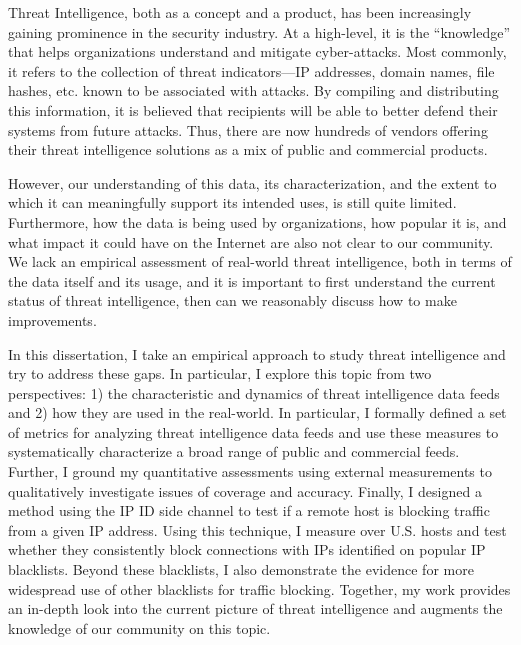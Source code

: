 \begin{dissertationabstract}

Threat Intelligence, both as a concept and a product, has been increasingly
gaining prominence in the security industry. At a high-level, it is the 
``knowledge'' that helps organizations understand and mitigate cyber-attacks.
Most commonly, it refers to the collection of threat indicators---IP 
addresses, domain names, file hashes, etc. known to be associated with 
attacks. By compiling and distributing this information, it is believed 
that recipients will be able to better 
defend their systems from future attacks. Thus, there are now hundreds of
vendors offering their threat intelligence solutions as a mix of public and
commercial products. 

However, our understanding of this data, its characterization, and the
extent to which it can meaningfully support its intended uses, is
still quite limited. Furthermore, how the data is being used by
organizations, how popular it is, and what impact it could have on the 
Internet are also not clear to our community. We lack an empirical 
assessment of real-world threat intelligence, both in terms of the data
itself and its usage, and it is important to first understand the current 
status of threat intelligence, then can we reasonably discuss how to make
improvements.

In this dissertation, I take an empirical approach to study threat 
intelligence and try to address these gaps. In particular, I explore 
this topic from two perspectives: 1) the characteristic and dynamics of 
threat intelligence data feeds and 2) how they are used in the 
real-world. In particular, I formally defined a set of metrics for 
analyzing threat intelligence data feeds and use these measures to 
systematically characterize a broad range of public and commercial feeds. 
Further, I ground my quantitative assessments using external measurements 
to qualitatively investigate issues of coverage and accuracy. Finally, I
designed a method using the IP ID side channel to test if a remote host 
is blocking traffic from a given IP address. Using this technique, I 
measure over {} U.S. hosts and test whether they 
consistently block connections with IPs identified on popular IP blacklists. 
Beyond these blacklists, I also demonstrate the evidence for more widespread 
use of other blacklists for traffic blocking. Together, my work provides
an in-depth look into the current picture of threat intelligence and augments
the knowledge of our community on this topic.

\end{dissertationabstract}
